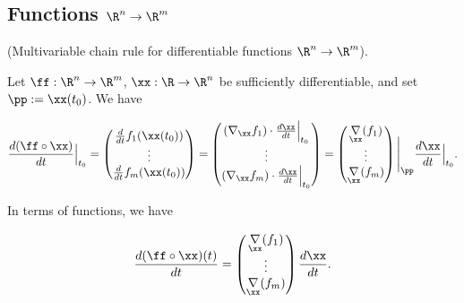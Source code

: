 \subsection*{Functions $\R^n \rightarrow \R^m$}

\begin{lemma}
    (Multivariable chain rule for differentiable functions $\R^n \rightarrow \R^m$).
    
    Let $\ff:\R^n \rightarrow \R^m$, $\xx:\R \rightarrow \R^n$ be sufficiently differentiable, and set $\pp := \xx(t_0)$. We have
    
    \begin{align*}
        \frac{d (\ff \circ \xx)}{dt}\Big|_{t_0}
        =
        \begin{pmatrix}
            \frac{d}{dt} f_1(\xx(t_0))
            \\
            \vdots
            \\
            \frac{d}{dt} f_m(\xx(t_0))
        \end{pmatrix}
        =
        \begin{pmatrix}
            (\nabla_\xx f_1) \cdot \frac{d\xx}{dt}\Big|_{t_0}
            \\
            \vdots
            \\
            (\nabla_\xx f_m) \cdot \frac{d\xx}{dt}\Big|_{t_0}
        \end{pmatrix}
        =
        \begin{pmatrix}
            \underset{\xx}{\nabla} (f_1)
            \\
            \vdots
            \\
            \underset{\xx}{\nabla} (f_m)
        \end{pmatrix}
        \Bigg|_\pp
        \frac{d \xx}{d t}\Big|_{t_0}.
    \end{align*}
    
    In terms of functions, we have
    
    \begin{align*}
        \frac{d (\ff \circ \xx)(t)}{dt}
        =
        \begin{pmatrix}
            \underset{\xx}{\nabla} (f_1)
            \\
            \vdots
            \\
            \underset{\xx}{\nabla} (f_m)
        \end{pmatrix}
        \frac{d \xx}{dt}.
    \end{align*}
    

\end{lemma}
